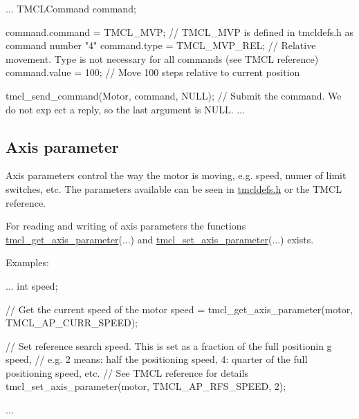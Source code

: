 \begin{DoxyCode}
  ...
  TMCLCommand command;

  command.command = TMCL_MVP;     // TMCL_MVP is defined in tmcldefs.h as command
       number "4"
  command.type    = TMCL_MVP_REL; // Relative movement. Type is not necessary for
       all commands (see TMCL reference)
  command.value   = 100;          // Move 100 steps relative to current position

  tmcl_send_command(Motor, command, NULL);   // Submit the command. We do not exp
      ect a reply, so the last argument is NULL.
  ...
\end{DoxyCode}
\hypertarget{index_axispar}{}\subsection{Axis parameter}\label{index_axispar}
Axis parameters control the way the motor is moving, e.g. speed, numer of limit switches, etc. The parameters available can be seen in \hyperlink{tmcldefs_8h}{tmcldefs.h} or the TMCL reference.

For reading and writing of axis parameters the functions \hyperlink{motor_8h_acde6e9e540c95467c08ad479ca3627cd}{tmcl\_\-get\_\-axis\_\-parameter}(...) and \hyperlink{motor_8h_a55a0a1ad09c44b1386a528b4e74f3962}{tmcl\_\-set\_\-axis\_\-parameter}(...) exists.

Examples:


\begin{DoxyCode}
  ...
  int speed;

  // Get the current speed of the motor
  speed = tmcl_get_axis_parameter(motor, TMCL_AP_CURR_SPEED);

  // Set reference search speed. This is set as a fraction of the full positionin
      g speed,
  // e.g. 2 means: half the positioning speed, 4: quarter of the full positioning
       speed, etc.
  // See TMCL reference for details
  tmcl_set_axis_parameter(motor, TMCL_AP_RFS_SPEED, 2);

  ...
\end{DoxyCode}
 